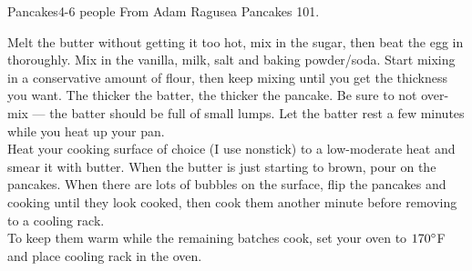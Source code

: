 \begin{recipe}{Pancakes}{4-6 people}{}
    \freeform From Adam Ragusea Pancakes 101.



    Melt the butter without getting it too hot, mix in the sugar, then beat the egg in thoroughly. Mix in the vanilla, milk, salt and baking powder/soda. Start mixing in a conservative amount of flour, then keep mixing until you get the thickness you want. The thicker the batter, the thicker the pancake. Be sure to not over-mix — the batter should be full of small lumps. Let the batter rest a few minutes while you heat up your pan.\\

    Heat your cooking surface of choice (I use nonstick) to a low-moderate heat and smear it with butter. When the butter is just starting to brown, pour on the pancakes. When there are lots of bubbles on the surface, flip the pancakes and cooking until they look cooked, then cook them another minute before removing to a cooling rack.\\

    To keep them warm while the remaining batches cook, set your oven to $170\degree$F and place cooling rack in the oven.

\end{recipe}